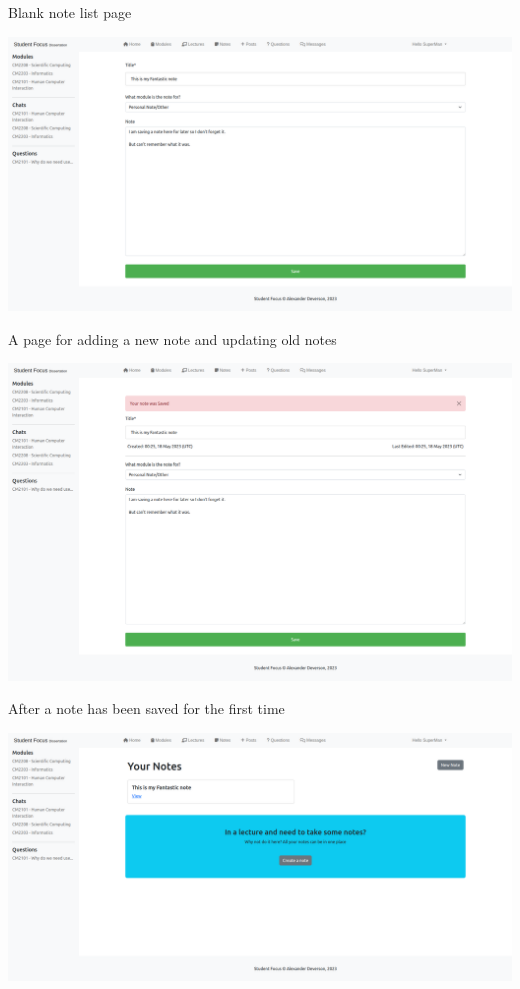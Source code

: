 Blank note list page

\includegraphics[scale=0.20]{images/application/16 - new_note.png}

A page for adding a new note and updating old notes

\includegraphics[scale=0.20]{images/application/17 - note_first_save.png}

After a note has been saved for the first time

\includegraphics[scale=0.20]{images/application/18 - all_notes_first.png}

